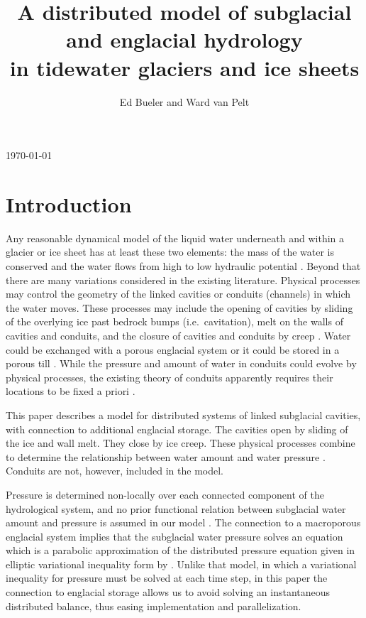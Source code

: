 \documentclass[11pt,final]{amsart}
\title[]{A distributed model of subglacial and englacial hydrology \\ in tidewater glaciers and ice sheets}
\author[]{Ed Bueler and Ward van Pelt}
\begin{document}
\graphicspath{{figs/}}

\scriptsize \hfill \today \normalsize
\vspace{0.5in}

\maketitle
\thispagestyle{empty}

\setcounter{tocdepth}{1}
\tableofcontents

\section{Introduction}

Any reasonable dynamical model of the liquid water underneath and within a glacier or ice sheet has at least these two elements: the mass of the water is conserved and the water flows from high to low hydraulic potential \citep{Clarke05}.  Beyond that there are many variations considered in the existing literature.  Physical processes may control the geometry of the linked cavities \citep{Kamb1987} or conduits (channels) \citep{Nye1976} in which the water moves.  These processes may include the opening of cavities by sliding of the overlying ice past bedrock bumps (i.e.~cavitation), melt on the walls of cavities and conduits, and the closure of cavities and conduits by creep \citep{Hewitt2011}.  Water could be exchanged with a porous englacial system \citep{Bartholomausetal2011} or it could be stored in a porous till \citep{Tulaczyketal2000b}.  While the pressure and amount of water in conduits could evolve by physical processes, the existing theory of conduits apparently requires their locations to be fixed a priori \citep{PimentelFlowers2011,Schoofmeltsupply}.

This paper describes a model for distributed systems of linked subglacial cavities, with connection to additional englacial storage.  The cavities open by sliding of the ice and wall melt.  They close by ice creep.  These physical processes combine to determine the relationship between water amount and water pressure \citep{Schoofetal2012}.  Conduits are not, however, included in the model.

Pressure is determined non-locally over each connected component of the hydrological system, and no prior functional relation between subglacial water amount and pressure is assumed in our model \citep[compare][]{FlowersClarke2002_theory}.  The connection to a macroporous englacial system implies that the subglacial water pressure solves an equation which is a parabolic approximation of the distributed pressure equation given in elliptic variational inequality form by \cite{Schoofetal2012}.  Unlike that model, in which a variational inequality for pressure must be solved at each time step, in this paper the connection to englacial storage allows us to avoid solving an instantaneous distributed balance, thus easing implementation and parallelization.
\end{document}
